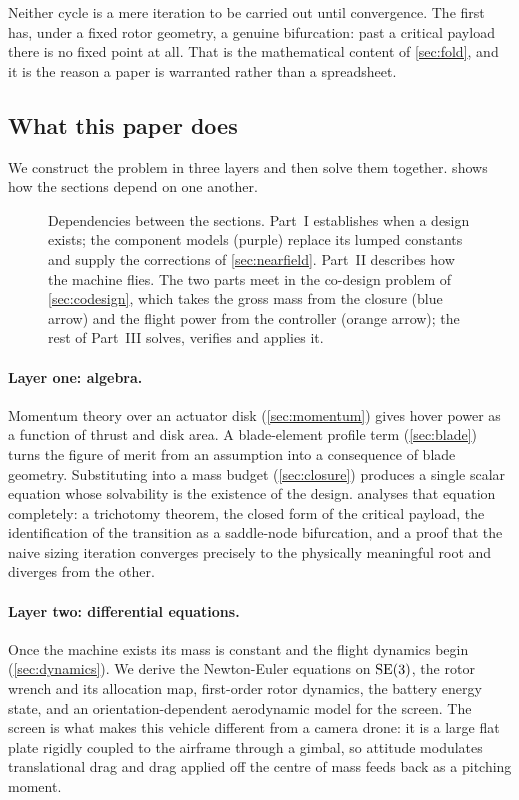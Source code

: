 Neither cycle is a mere iteration to be carried out until convergence. The
first has, under a fixed rotor geometry, a genuine bifurcation: past a
critical payload there is no fixed point at all. That is the mathematical
content of \cref{sec:fold}, and it is the reason a paper is warranted rather
than a spreadsheet.

\subsection{What this paper does}

We construct the problem in three layers and then solve them together.
 shows how the sections depend on one another.

\begin{figure}[tbp]
\centering

\caption{Dependencies between the sections. Part~I establishes when a design
exists; the component models (purple) replace its lumped constants and supply
the corrections of \cref{sec:nearfield}. Part~II describes how the machine
flies. The two parts meet in the co-design problem of \cref{sec:codesign},
which takes the gross mass from the closure (blue arrow) and the flight power
from the controller (orange arrow); the rest of Part~III solves, verifies and
applies it.}
\label{fig:roadmap}
\end{figure}

\paragraph{Layer one: algebra.} Momentum theory over an actuator disk
(\cref{sec:momentum}) gives hover power as a function of thrust and disk area.
A blade-element profile term (\cref{sec:blade}) turns the figure of merit from
an assumption into a consequence of blade geometry. Substituting into a mass
budget (\cref{sec:closure}) produces a single scalar equation whose solvability
is the existence of the design.  analyses that equation
completely: a trichotomy theorem, the closed form of the critical payload, the
identification of the transition as a saddle-node bifurcation, and a proof that
the naive sizing iteration converges precisely to the physically meaningful
root and diverges from the other.

\paragraph{Layer two: differential equations.} Once the machine exists its mass
is constant and the flight dynamics begin (\cref{sec:dynamics}). We derive the
Newton-Euler equations on $\mathrm{SE}(3)$, the rotor wrench and its allocation map,
first-order rotor dynamics, the battery energy state, and an
orientation-dependent aerodynamic model for the screen. The screen is what
makes this vehicle different from a camera drone: it is a large flat plate
rigidly coupled to the airframe through a gimbal, so attitude modulates
translational drag and drag applied off the centre of mass feeds back as a
pitching moment.

